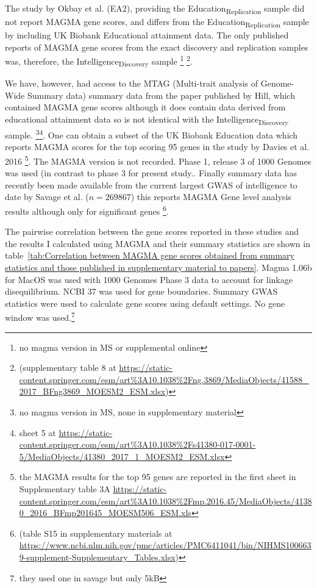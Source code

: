 The study by Okbay et al. (EA2)\cite{okbay2016genome}, providing the Education\textsubscript{Replication} sample did not report MAGMA gene scores, and differs from the Education\textsubscript{Replication} sample by including UK Biobank Educational attainment data. The only published reports of MAGMA gene scores from the exact discovery and replication samples was, therefore, the Intelligence\textsubscript{Discovery} sample \cite{sniekers2017genome}\footnote{no magma version in MS or supplemental online} \footnote{(supplementary table 8 at \url{https://static-content.springer.com/esm/art\%3A10.1038\%2Fng.3869/MediaObjects/41588_2017_BFng3869_MOESM2_ESM.xlsx})}.

We have, however, had access to the MTAG (Multi-trait analysis of Genome-Wide Summary data) summary data from the paper published by Hill, which contained MAGMA gene scores although it does contain data derived from educational attainment data so is not identical with the Intelligence\textsubscript{Discovery} sample. \footnote{no magma version in MS, none in supplementary material}\footnote{ sheet 5 at \url{https://static-content.springer.com/esm/art\%3A10.1038\%2Fs41380-017-0001-5/MediaObjects/41380_2017_1_MOESM2_ESM.xlsx}}\cite{hill2019combined}. One
can obtain a subset of the UK Biobank Education data which reports MAGMA scores for the top scoring 95 genes in the study by Davies et al. 2016 \cite{davies2016genome} \footnote{the MAGMA results for the top 95 genes are reported in the first sheet in Supplementary table 3A \url{https://static-content.springer.com/esm/art\%3A10.1038\%2Fmp.2016.45/MediaObjects/41380_2016_BFmp201645_MOESM506_ESM.xls}}. The MAGMA version is not recorded. Phase 1, release 3 of 1000 Genomes was used (in contrast to phase 3 for present study.. Finally  summary data has recently been made available from the current largest GWAS of intelligence to date by Savage et al. \cite{savage2018genome} ($n=269 867$) this reports MAGMA Gene level analysis results although only for significant genes \footnote{ (table S15 in supplementary materials at \url{https://www.ncbi.nlm.nih.gov/pmc/articles/PMC6411041/bin/NIHMS1006639-supplement-Supplementary_Tables.xlsx})}.

The pairwise correlation between the gene scores reported in these studies and the results I calculated using MAGMA and their summary statistics  are shown in table~\ref{tab:Correlation between MAGMA gene scores obtained from summary statistics and those published in supplementary material to papers}. Magma 1.06b for MacOS was used with 1000 Genomes Phase 3 data to account for linkage disequilibrium. NCBI 37 was used for gene boundaries. Summary GWAS statistics were used to calculate gene scores using default settings. No gene window was used.\footnote{they used one in savage but only 5kB}


